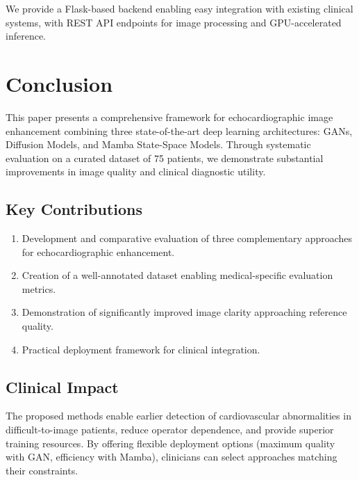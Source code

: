 \documentclass[10pt,conference,letterpaper]{IEEEtran}
\begin{document}
\begin{itemize}
We provide a Flask-based backend enabling easy integration with existing clinical systems, with REST API endpoints for image processing and GPU-accelerated inference.

\section{Conclusion}
\label{sec:conclusion}

This paper presents a comprehensive framework for echocardiographic image enhancement combining three state-of-the-art deep learning architectures: GANs, Diffusion Models, and Mamba State-Space Models. Through systematic evaluation on a curated dataset of 75 patients, we demonstrate substantial improvements in image quality and clinical diagnostic utility.

\subsection{Key Contributions}

\begin{enumerate}
  \item Development and comparative evaluation of three complementary approaches for echocardiographic enhancement.
  
  \item Creation of a well-annotated dataset enabling medical-specific evaluation metrics.
  
  \item Demonstration of significantly improved image clarity approaching reference quality.
  
  \item Practical deployment framework for clinical integration.
\end{enumerate}

\subsection{Clinical Impact}

The proposed methods enable earlier detection of cardiovascular abnormalities in difficult-to-image patients, reduce operator dependence, and provide superior training resources. By offering flexible deployment options (maximum quality with GAN, efficiency with Mamba), clinicians can select approaches matching their constraints.


\end{itemize}
\end{document}
